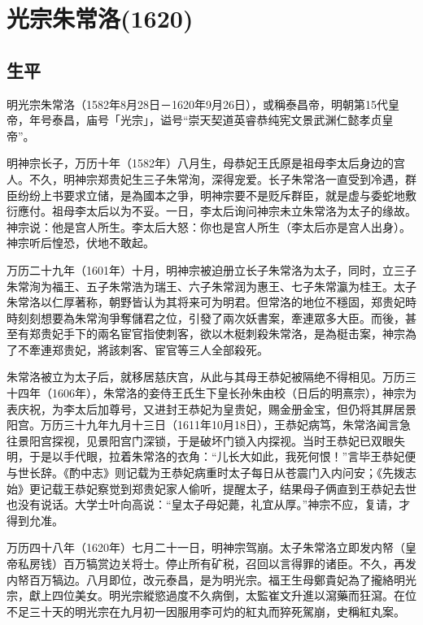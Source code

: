 
\section{光宗朱常洛\tiny(1620)}

\subsection{生平}

明光宗朱常洛（1582年8月28日－1620年9月26日），或稱泰昌帝，明朝第15代皇帝，年号泰昌，庙号「光宗」，谥号“崇天契道英睿恭纯宪文景武渊仁懿孝贞皇帝”。

明神宗长子，万历十年（1582年）八月生，母恭妃王氏原是祖母李太后身边的宫人。不久，明神宗郑贵妃生三子朱常洵，深得宠爱。长子朱常洛一直受到冷遇，群臣纷纷上书要求立储，是為國本之爭，明神宗要不是贬斥群臣，就是虚与委蛇地敷衍應付。祖母李太后以为不妥。一日，李太后询问神宗未立朱常洛为太子的缘故。神宗说：他是宫人所生。李太后大怒：你也是宫人所生（李太后亦是宫人出身）。神宗听后惶恐，伏地不敢起。

万历二十九年（1601年）十月，明神宗被迫册立长子朱常洛为太子，同时，立三子朱常洵为福王、五子朱常浩为瑞王、六子朱常润为惠王、七子朱常瀛为桂王。太子朱常洛以仁厚著称，朝野皆认为其将来可为明君。但常洛的地位不穩固，郑贵妃時時刻刻想要為朱常洵爭奪儲君之位，引發了兩次妖書案，牽連眾多大臣。而後，甚至有郑贵妃手下的兩名宦官指使刺客，欲以木梃刺殺朱常洛，是為梃击案，神宗為了不牽連郑贵妃，將該刺客、宦官等三人全部殺死。

朱常洛被立为太子后，就移居慈庆宫，从此与其母王恭妃被隔绝不得相见。万历三十四年（1606年），朱常洛的妾侍王氏生下皇长孙朱由校（日后的明熹宗），神宗为表庆祝，为李太后加尊号，又进封王恭妃为皇贵妃，赐金册金宝，但仍将其屏居景阳宫。万历三十九年九月十三日（1611年10月18日），王恭妃病笃，朱常洛闻言急往景阳宫探视，见景阳宫门深锁，于是破坏门锁入内探视。当时王恭妃已双眼失明，于是以手代眼，拉着朱常洛的衣角：“儿长大如此，我死何恨！”言毕王恭妃便与世长辞。《酌中志》则记载为王恭妃病重时太子每日从苍震门入内问安；《先拨志始》更记载王恭妃察觉到郑贵妃家人偷听，提醒太子，结果母子俩直到王恭妃去世也没有说话。大学士叶向高说：“皇太子母妃薨，礼宜从厚。”神宗不应，复请，才得到允准。

万历四十八年（1620年）七月二十一日，明神宗驾崩。太子朱常洛立即发内帑（皇帝私房钱）百万犒赏边关将士。停止所有矿税，召回以言得罪的诸臣。不久，再发内帑百万犒边。八月即位，改元泰昌，是为明光宗。福王生母鄭貴妃為了攏絡明光宗，獻上四位美女。明光宗縱慾過度不久病倒，太監崔文升進以瀉藥而狂瀉。在位不足三十天的明光宗在九月初一因服用李可灼的紅丸而猝死駕崩，史稱紅丸案。

